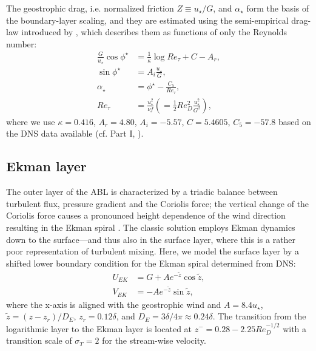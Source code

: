 \documentclass[smallcondensed,final]{svjour3}
\begin{document}

The geostrophic drag, i.e. normalized friction $Z\equiv u_\star/G$, and $\alpha_\star$ form the basis of the boundary-layer scaling, and they are estimated using the semi-empirical drag-law introduced by \cite{spalart1989theoretical}, which describes them as functions of only the Reynolds number:
\begin{subequations}\label{eqn:drag}
	\begin{align}
		\frac{G}{u_\star}\cos\phi^\star &= \frac{1}{\kappa}\log Re_\tau + C - A_r, \\
		\sin\phi^\star &= A_i\frac{u_\star}{G},\\
		\alpha_\star &= \phi^\star - \frac{C_5}{Re_\tau},\\
		Re_\tau &= \frac{u_\star^2}{\nu f} \left( = \frac{1}{2} Re_{D}^2 \frac{u_{\star}^2}{G^2}\right),
	\end{align}
\end{subequations}
where we use $\kappa = 0.416$, $A_r = 4.80$, $A_i = -5.57$, $C = 5.4605$, $C_5 = -57.8$ based on the DNS data available (cf. Part I, \cite{ansorge2014global}).



\subsection{Ekman layer}
\label{sec:ekmanlayer}
The outer layer of the ABL is characterized by a triadic balance between turbulent flux, pressure gradient and the Coriolis force; the vertical change of the Coriolis force causes a pronounced height dependence of the wind direction resulting in the Ekman spiral \citep{ekman:AMA1905}. The classic solution employs Ekman dynamics down to the surface---and thus also in the surface layer, where this is a rather poor representation of turbulent mixing. Here, we model the surface layer by a shifted lower boundary condition for the Ekman spiral determined from DNS:
\begin{subequations}
  \begin{align}
    U_{EK} &= G + Ae^{-\tilde{z}}\cos\tilde{z},\\
		V_{EK} &= - Ae^{-\tilde{z}}\sin\tilde{z},
  \end{align}
\end{subequations}
where the x-axis is aligned with the geostrophic wind and $A = 8.4u_\star$, $\tilde{z} = (z-z_r)/D_E$, $z_r = 0.12\delta$, and $D_E = 3\delta/4\pi\approx 0.24\delta$. The transition from the logarithmic layer to the Ekman layer is located at $z^{-}=0.28- 2.25 Re_{D}^{-1/2}$ with a transition scale of $\sigma_T=2$ for the stream-wise velocity.
\end{document}
